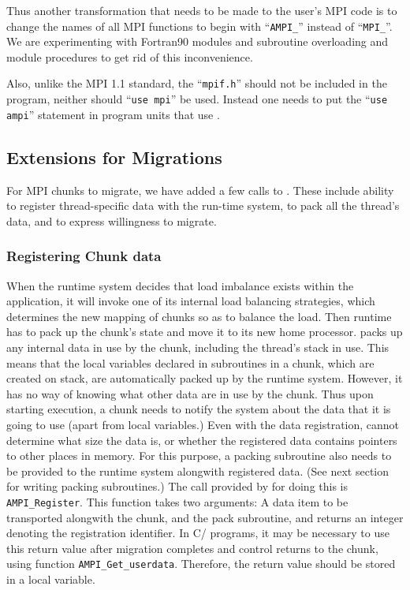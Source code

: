 \documentclass[10pt]{article}
\begin{document}
Thus another transformation that needs to be made to the user's MPI code is to
change the names of all MPI functions to begin with ``\texttt{AMPI\_}'' instead
of ``\texttt{MPI\_}''. We are experimenting with Fortran90 modules and
subroutine overloading and module procedures to get rid of this inconvenience.

Also, unlike the MPI 1.1 standard, the ``\texttt{mpif.h}'' should not be
included in the \ampi{} program, neither should ``\texttt{use mpi}'' be used.
Instead one needs to put the ``\texttt{use ampi}'' statement in program units
that use \ampi{}.

\subsection{Extensions for Migrations}

For MPI chunks to migrate, we have added a few calls to \ampi{}. These include
ability to register thread-specific data with the run-time system, to pack all
the thread's data, and to express willingness to migrate.

\subsubsection{Registering Chunk data}

When the \ampi{} runtime system decides that load imbalance exists within the
application, it will invoke one of its internal load balancing strategies,
which determines the new mapping of \ampi{} chunks so as to balance the load.
Then \ampi{} runtime has to pack up the chunk's state and move it to its new
home processor. \ampi{} packs up any internal data in use by the chunk,
including the thread's stack in use. This means that the local variables
declared in subroutines in a chunk, which are created on stack, are
automatically packed up by the \ampi{} runtime system. However, it has no way
of knowing what other data are in use by the chunk. Thus upon starting
execution, a chunk needs to notify the system about the data that it is going
to use (apart from local variables.) Even with the data registration, \ampi{}
cannot determine what size the data is, or whether the registered data contains
pointers to other places in memory. For this purpose, a packing subroutine also
needs to be provided to the \ampi{} runtime system alongwith registered data.
(See next section for writing packing subroutines.) The call provided by
\ampi{} for doing this is \texttt{AMPI\_Register}. This function takes two
arguments: A data item to be transported alongwith the chunk, and the pack
subroutine, and returns an integer denoting the registration identifier. In
C/\CC{} programs, it may be necessary to use this return value after migration
completes and control returns to the chunk, using function
\texttt{AMPI\_Get\_userdata}. Therefore, the return value should be stored in a
local variable.
\end{document}
